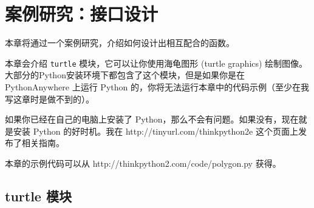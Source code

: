 

\chapter{案例研究：接口设计}
\label{turtlechap}


本章将通过一个案例研究，介绍如何设计出相互配合的函数。

本章会介绍 \lstinline{turtle} 模块，它可以让你使用海龟图形 (turtle graphics) 绘制图像。大部分的Python安装环境下都包含了这个模块，但是如果你是在 PythonAnywhere 上运行 Python 的，你将无法运行本章中的代码示例（至少在我写这章时是做不到的）。

如果你已经在自己的电脑上安装了 Python，那么不会有问题。如果没有，现在就是安装 Python 的好时机。我在 http://tinyurl.com/thinkpython2e 这个页面上发布了相关指南。

本章的示例代码可以从 http://thinkpython2.com/code/polygon.py 获得。

\section{turtle 模块}
\label{turtle}


